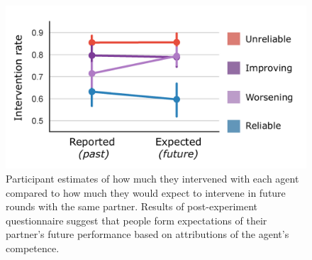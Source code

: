 \documentclass[10pt,letterpaper]{article}
\begin{document}
\begin{figure}[H]
\begin{center}
\includegraphics[width=\linewidth]{img/survey_intervention_expectations_clean.pdf}
\end{center}
\caption{Participant estimates of how much they intervened with each agent compared to how much they would expect to intervene in future rounds with the same partner. Results of post-experiment questionnaire suggest that people form expectations of their partner's future performance based on attributions of the agent's competence.} 
\label{fig:survey}
\end{figure}
\end{document}

